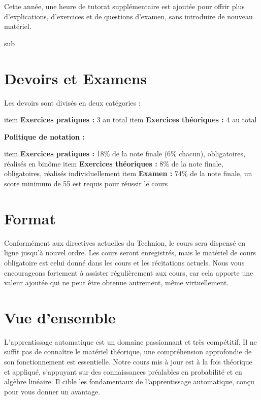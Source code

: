 \documentclass[12pt]{article}
\begin{document}
Cette année, une heure de tutorat supplémentaire est ajoutée pour offrir plus d'explications, d'exercices et de questions d'examen, sans introduire de nouveau matériel.

sub\section{Devoirs et Examens}

Les devoirs sont divisés en deux catégories :
\begin{itemize}
    item \textbf{Exercices pratiques :} 3 au total
    item \textbf{Exercices théoriques :} 4 au total
\end{itemize}

\textbf{Politique de notation :}
\begin{itemize}
    item \textbf{Exercices pratiques :} 18\% de la note finale (6\% chacun), obligatoires, réalisés en binôme
    item \textbf{Exercices théoriques :} 8\% de la note finale, obligatoires, réalisés individuellement
    item \textbf{Examen :} 74\% de la note finale, un score minimum de 55 est requis pour réussir le cours
\end{itemize}

\section{Format}

Conformément aux directives actuelles du Technion, le cours sera dispensé en ligne jusqu'à nouvel ordre. Les cours seront enregistrés, mais le matériel de cours obligatoire est celui donné dans les cours et les récitations actuels. Nous vous encourageons fortement à assister régulièrement aux cours, car cela apporte une valeur ajoutée qui ne peut être obtenue autrement, même virtuellement.

\section{Vue d'ensemble}

L'apprentissage automatique est un domaine passionnant et très compétitif. Il ne suffit pas de connaître le matériel théorique, une compréhension approfondie de son fonctionnement est essentielle. Notre cours mis à jour est à la fois théorique et appliqué, s'appuyant sur des connaissances préalables en probabilité et en algèbre linéaire. Il cible les fondamentaux de l'apprentissage automatique, conçu pour vous donner un avantage.
\end{document}
